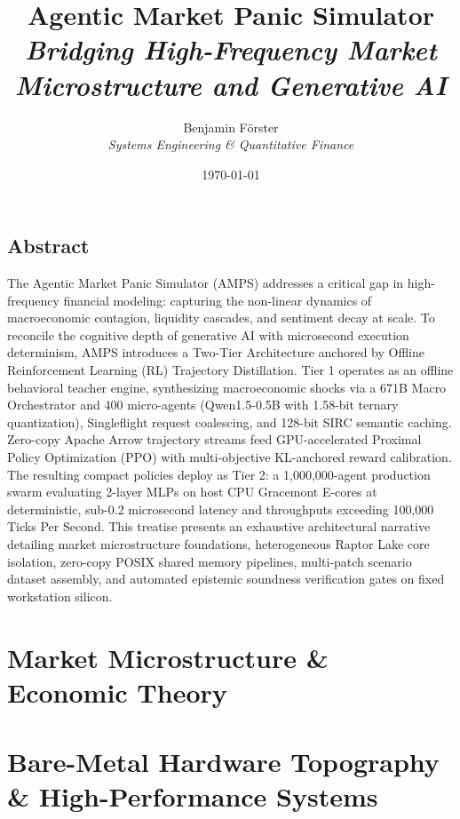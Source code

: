 \documentclass[11pt,a4paper,oneside]{book}
\title{\Huge \textbf{Agentic Market Panic Simulator}\\[0.5cm] 
\LARGE \textit{Bridging High-Frequency Market Microstructure and Generative AI}}
\author{\Large Benjamin Förster \\ \textit{Systems Engineering \& Quantitative Finance}}
\date{\today}
\begin{document}
\frontmatter
\maketitle

\chapter*{Abstract}
The Agentic Market Panic Simulator (AMPS) addresses a critical gap in high-frequency financial modeling: capturing the non-linear dynamics of macroeconomic contagion, liquidity cascades, and sentiment decay at scale. To reconcile the cognitive depth of generative AI with microsecond execution determinism, AMPS introduces a Two-Tier Architecture anchored by Offline Reinforcement Learning (RL) Trajectory Distillation. Tier 1 operates as an offline behavioral teacher engine, synthesizing macroeconomic shocks via a 671B Macro Orchestrator and 400 micro-agents (Qwen1.5-0.5B with 1.58-bit ternary quantization), Singleflight request coalescing, and 128-bit SIRC semantic caching. Zero-copy Apache Arrow trajectory streams feed GPU-accelerated Proximal Policy Optimization (PPO) with multi-objective KL-anchored reward calibration. The resulting compact policies deploy as Tier 2: a 1,000,000-agent production swarm evaluating 2-layer MLPs on host CPU Gracemont E-cores at deterministic, sub-0.2 microsecond latency and throughputs exceeding 100,000 Ticks Per Second. This treatise presents an exhaustive architectural narrative detailing market microstructure foundations, heterogeneous Raptor Lake core isolation, zero-copy POSIX shared memory pipelines, multi-patch scenario dataset assembly, and automated epistemic soundness verification gates on fixed workstation silicon.

\tableofcontents

\mainmatter

\part{Market Microstructure \& Economic Theory}





\part{Bare-Metal Hardware Topography \& High-Performance Systems}




\end{document}
